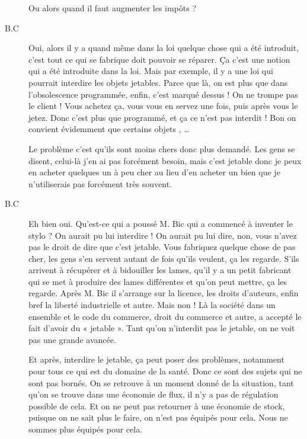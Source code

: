 \begin{description}
Ou alors quand il faut augmenter les impôts ?

\vspace{1\baselineskip}

\item[B.C]Oui, alors il y a quand même dans la loi quelque chose qui a été introduit, c'est tout ce qui se fabrique doit pouvoir se réparer. Ça c'est une notion qui a été introduite dans la loi. Mais par exemple, il y a une loi qui pourrait interdire les objets jetables. Parce que là, on est plus que dans l'obsolescence programmée, enfin, c'est marqué dessus ! On ne trompe pas le client ! Vous achetez ça, vous vous en servez une fois, puis après vous le jetez. Donc c'est plus que programmé, et ça ce n’est pas interdit ! Bon on convient évidemment que certains objets , …

\vspace{1\baselineskip}

Le problème c'est qu'ils sont moins chers donc plus demandé. Les gens se disent, celui-là j'en ai pas forcément besoin, mais c'est jetable donc je peux en acheter quelques un à peu cher au lieu d'en acheter un bien que je n'utiliserais pas forcément très souvent.

\vspace{1\baselineskip}

\item[B.C]Eh bien oui. Qu'est-ce qui a poussé M. Bic qui a commencé à inventer le stylo ? On aurait pu lui interdire ! On aurait pu lui dire, non, vous n'avez pas le droit de dire que c'est jetable. Vous fabriquez quelque chose de pas cher, les gens s'en servent autant de fois qu'ils veulent, ça les regarde. S’ils arrivent à récupérer et à bidouiller les lames, qu'il y a un petit fabricant qui se met à produire des lames différentes et qu'on peut mettre, ça les regarde. Après M. Bic il s'arrange sur la licence, les droits d'auteurs, enfin bref la liberté industrielle et autre. Mais non ! Là la société dans un ensemble et le code du commerce, droit du commerce et autre, a accepté le fait d'avoir du « jetable ». Tant qu’on n’interdit pas le jetable, on ne voit pas une grande avancée. 

Et après, interdire le jetable, ça peut poser des problèmes, notamment pour tous ce qui est du domaine de la santé. Donc ce sont des sujets qui ne sont pas bornés. On se retrouve à un moment donné de la situation, tant qu'on se trouve dans une économie de flux, il n'y a pas de régulation possible de cela. Et on ne peut pas retourner à une économie de stock, puisque on ne sait plus le faire, on n'est pas équipés pour cela. Nous ne sommes plus équipés pour cela. 


\end{description}
